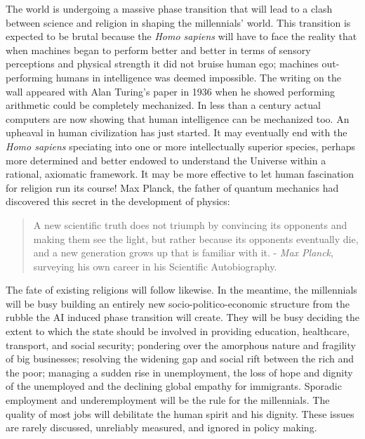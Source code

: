 \begin{multicols}{2}
The world is undergoing a massive phase transition that will lead to a clash between science and religion in shaping the millennials’ world. This transition is expected to be brutal because the \textit{Homo sapiens} will have to face the reality that when machines began to perform better and better in terms of sensory perceptions and physical strength it did not bruise human ego; machines out-performing humans in intelligence was deemed impossible. The writing on the wall appeared with Alan Turing's paper in 1936 when he showed performing arithmetic could be completely mechanized. In less than a century actual computers are now showing that human intelligence can be mechanized too. An upheaval in human civilization has just started. It may eventually end with the \textit{Homo sapiens} speciating into one or more intellectually superior species, perhaps more determined and better endowed to understand the Universe within a rational, axiomatic framework. It may be more effective to let human fascination for religion run its course! Max Planck, the father of quantum mechanics had discovered this secret in the development of physics:
\begin{quote}
A new scientific truth does not triumph by convincing its opponents and making them see the light, but rather because its opponents eventually die, and a new generation grows up that is familiar with it. - \textit{Max Planck}, surveying his own career in his Scientific Autobiography. 
\end{quote}

The fate of existing religions will follow likewise. In the meantime, the millennials will be busy building an entirely new socio-politico-economic structure from the rubble the AI induced phase transition will create. They will be busy deciding the extent to which the state should be involved in providing education, healthcare, transport, and social security; pondering over the amorphous nature and fragility of big businesses; resolving the widening gap and social rift between the rich and the poor; managing a sudden rise in unemployment, the loss of hope and dignity of the unemployed and the declining global empathy for immigrants. Sporadic employment and underemployment will be the rule for the millennials. The quality of most jobs will debilitate the human spirit and his dignity. These issues are rarely discussed, unreliably measured, and ignored in policy making.



\end{multicols}
